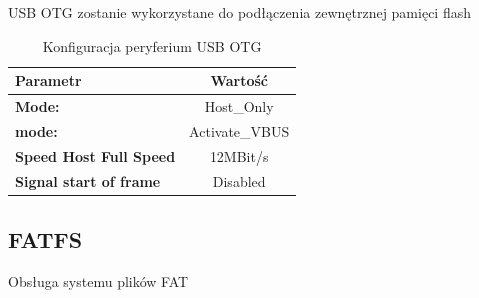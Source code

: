 \documentclass[10pt, a4paper]{article}
\begin{document}
USB OTG zostanie wykorzystane do podłączenia zewnętrznej pamięci flash

\begin{table}[H]
	\centering
	\begin{tabular}{|l|c|} \hline
		\textbf{Parametr} & Wartość \\
		\hline
\hline  \textbf{Mode:} &Host{\_}Only\\
\hline  \textbf{mode:} &Activate{\_}VBUS \\
\hline  \textbf{Speed Host Full Speed} &12MBit/s\\
\hline  \textbf{Signal start of frame} &Disabled\\
 \hline 
	\end{tabular}
	\caption{Konfiguracja peryferium USB OTG}
	\label{tab:USART}
\end{table}
\newpage
\subsection{FATFS}
 Obsługa systemu plików FAT
\end{document}

